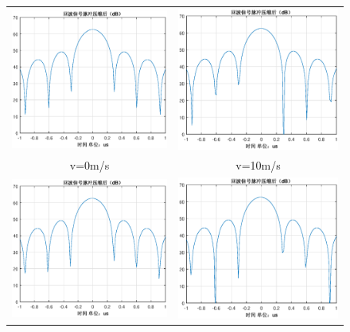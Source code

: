 \documentclass[12pt]{article}
\begin{document}
\begin{longtable}{ccccc}
\end{longtable}

\begin{figure}[htbp]
  \centering
  \begin{tabular}{cc}
    \includegraphics[width=.5\textwidth]{Doppler_sensitivity_0000}&\includegraphics[width=.5\textwidth]{Doppler_sensitivity_0010}\\
    v=0m/s&v=10m/s\\
    \includegraphics[width=.5\textwidth]{Doppler_sensitivity_0020}&\includegraphics[width=.5\textwidth]{Doppler_sensitivity_0030}\\

\end{tabular}
\end{figure}
\end{document}
